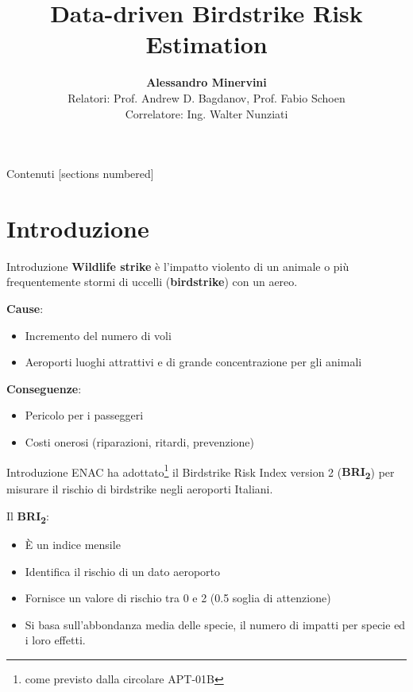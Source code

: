 \documentclass[10pt]{beamer}
\title{Data-driven Birdstrike Risk Estimation}
\date{}
\author{\textbf{Alessandro Minervini}\protect \\ Relatori: Prof. Andrew D. Bagdanov, Prof. Fabio Schoen \protect \\ Correlatore: Ing. Walter Nunziati}
\institute{Università degli Studi di Firenze \\ Scuola di Ingegneria\\ Ingegneria Informatica}
\begin{document}
\maketitle

\begin{frame}{Contenuti}
  [sections numbered]
  \tableofcontents[hideallsubsections]
\end{frame}

\section{Introduzione}

\begin{frame}[fragile]{Introduzione}
\textbf{Wildlife strike} è l'impatto violento di un animale o più frequentemente stormi di uccelli (\textbf{birdstrike}) con un aereo.

\textbf{Cause}:
\begin{itemize}
    \item Incremento del numero di voli 
    \item Aeroporti luoghi attrattivi e di grande concentrazione per gli animali
\end{itemize}

\textbf{Conseguenze}:
\begin{itemize}
    \item Pericolo per i passeggeri
    \item Costi onerosi (riparazioni, ritardi, prevenzione)
\end{itemize}
\end{frame}

\begin{frame}{Introduzione}
ENAC ha adottato\footnote{come previsto dalla circolare APT-01B} il Birdstrike Risk Index version 2 (\textbf{BRI\textsubscript{2}}) per misurare il rischio di birdstrike negli aeroporti Italiani.

Il \textbf{BRI\textsubscript{2}}:
\begin{itemize}
    \item \`E un indice mensile
    \item Identifica il rischio di un dato aeroporto
    \item Fornisce un valore di rischio tra 0 e 2 (0.5 soglia di attenzione)
    \item Si basa sull'abbondanza media delle specie, il numero di impatti per specie ed i loro effetti.
\end{itemize}
\end{frame}
\end{document}
